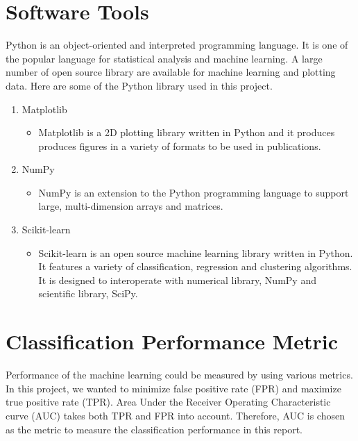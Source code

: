 \section{Software Tools}
Python\citep{Rossum:1995:PRM:869369} is an object-oriented and interpreted programming language. It is one of the popular language for statistical analysis and machine learning. A large number of open source library are available for machine learning and plotting data. Here are some of the Python library used in this project.

\begin{enumerate}
    \item Matplotlib
        \begin{itemize}
            \item Matplotlib \citep{Hunter:2007} is a 2D plotting library written in Python and it produces produces figures in a variety of formats to be used in publications.
        \end{itemize}
    \item NumPy
        \begin{itemize}
            \item NumPy \citep{developersnumpy} is an extension to the Python programming language to support large, multi-dimension arrays and matrices.
        \end{itemize}
    \item Scikit-learn
        \begin{itemize}
            \item Scikit-learn \citep{scikit-learn} is an open source machine learning library written in Python. It features a variety of classification, regression and clustering algorithms. It is designed to interoperate with numerical library, NumPy and scientific library, SciPy.
        \end{itemize}
\end{enumerate}

\section{Classification Performance Metric}
Performance of the machine learning could be measured by using various metrics. In this project, we wanted to minimize false positive rate (FPR) and maximize true positive rate (TPR). Area Under the Receiver Operating Characteristic curve (AUC) takes both TPR and FPR into account. Therefore, AUC is chosen as the metric to measure the classification performance in this report.